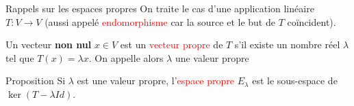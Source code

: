 \begin{parag}{Rappels sur les espaces propres}
On traite le cas d'une application linéaire $T : V \to V$ (aussi appelé \textcolor{red}{endomorphisme} car la source et le but de $T$ coïncident).
\begin{definition}
    Un vecteur \textbf{non nul} $x \in V$ est un \textcolor{red}{vecteur propre} de $T$ s'il existe un nombre réel $\lambda$ tel que $T(x) = \lambda x$. On appelle alors $\lambda$ une valeur propre  
\end{definition}
\end{parag}
\begin{parag}{Proposition}
    Si $\lambda$ est une valeur propre, l'\textcolor{red}{espace propre} $E_\lambda$ est le sous-espace de $\ker(T - \lambda Id)$.
    
\end{parag}


